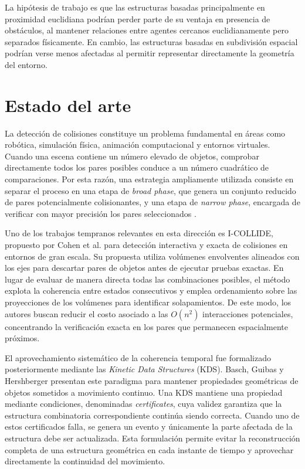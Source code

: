 \documentclass[12pt]{article}
\begin{document}
La hipótesis de trabajo es que las estructuras basadas principalmente en proximidad euclidiana podrían perder parte de su ventaja en presencia de obstáculos, al mantener relaciones entre agentes cercanos euclidianamente pero separados físicamente. En cambio, las estructuras basadas en subdivisión espacial podrían verse menos afectadas al permitir representar directamente la geometría del entorno.

\section{Estado del arte}

La detección de colisiones constituye un problema fundamental en áreas como robótica, simulación física, animación computacional y entornos virtuales. Cuando una escena contiene un número elevado de objetos, comprobar directamente todos los pares posibles conduce a un número cuadrático de comparaciones. Por esta razón, una estrategia ampliamente utilizada consiste en separar el proceso en una etapa de \textit{broad phase}, que genera un conjunto reducido de pares potencialmente colisionantes, y una etapa de \textit{narrow phase}, encargada de verificar con mayor precisión los pares seleccionados \cite{cohen1995icollide,guibas2001kinetic,serpa2019flexible,cao2023fast}.

Uno de los trabajos tempranos relevantes en esta dirección es I-COLLIDE, propuesto por Cohen et al. \cite{cohen1995icollide} para detección interactiva y exacta de colisiones en entornos de gran escala. Su propuesta utiliza volúmenes envolventes alineados con los ejes para descartar pares de objetos antes de ejecutar pruebas exactas. En lugar de evaluar de manera directa todas las combinaciones posibles, el método explota la coherencia entre estados consecutivos y emplea ordenamiento sobre las proyecciones de los volúmenes para identificar solapamientos. De este modo, los autores buscan reducir el costo asociado a las \(O(n^2)\) interacciones potenciales, concentrando la verificación exacta en los pares que permanecen espacialmente próximos.

El aprovechamiento sistemático de la coherencia temporal fue formalizado posteriormente mediante las \textit{Kinetic Data Structures} (KDS). Basch, Guibas y Hershberger \cite{basch1999mobile} presentan este paradigma para mantener propiedades geométricas de objetos sometidos a movimiento continuo. Una KDS mantiene una propiedad mediante condiciones, denominadas \textit{certificates}, cuya validez garantiza que la estructura combinatoria correspondiente continúa siendo correcta. Cuando uno de estos certificados falla, se genera un evento y únicamente la parte afectada de la estructura debe ser actualizada. Esta formulación permite evitar la reconstrucción completa de una estructura geométrica en cada instante de tiempo y aprovechar directamente la continuidad del movimiento.
\end{document}
